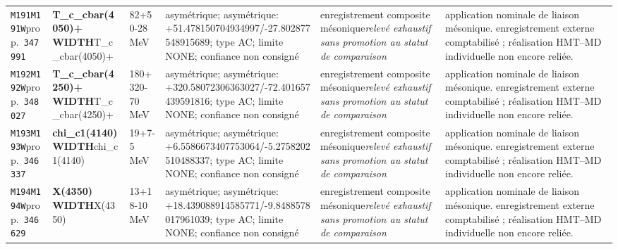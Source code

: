 \begin{landscape}
\begin{longtable}{L{1.85cm}L{4.45cm}L{2.35cm}L{4.05cm}L{3.35cm}L{7.15cm}}
\texttt{M191}\newline \texttt{M191W}\newline prop.\ \texttt{347991} & \textbf{T\_\allowbreak{}c\_\allowbreak{}cbar(4050)+ WIDTH}\newline T\_\allowbreak{}c\_\allowbreak{}cbar(4050)+ & 82+50-28\,MeV & asymétrique; asymétrique: +51.478150704934997/-27.802877548915689; type AC; limite NONE; confiance non consigné & enregistrement composite mésonique\newline \emph{relevé exhaustif sans promotion au statut de comparaison} & application nominale de liaison mésonique. enregistrement externe comptabilisé ; réalisation HMT--MD individuelle non encore reliée. \\
\texttt{M192}\newline \texttt{M192W}\newline prop.\ \texttt{348027} & \textbf{T\_\allowbreak{}c\_\allowbreak{}cbar(4250)+ WIDTH}\newline T\_\allowbreak{}c\_\allowbreak{}cbar(4250)+ & 180+320-70\,MeV & asymétrique; asymétrique: +320.58072306363027/-72.401657439591816; type AC; limite NONE; confiance non consigné & enregistrement composite mésonique\newline \emph{relevé exhaustif sans promotion au statut de comparaison} & application nominale de liaison mésonique. enregistrement externe comptabilisé ; réalisation HMT--MD individuelle non encore reliée. \\
\texttt{M193}\newline \texttt{M193W}\newline prop.\ \texttt{346337} & \textbf{chi\_\allowbreak{}c1(4140) WIDTH}\newline chi\_\allowbreak{}c1(4140) & 19+7-5\,MeV & asymétrique; asymétrique: +6.5586673407753064/-5.2758202510488337; type AC; limite NONE; confiance non consigné & enregistrement composite mésonique\newline \emph{relevé exhaustif sans promotion au statut de comparaison} & application nominale de liaison mésonique. enregistrement externe comptabilisé ; réalisation HMT--MD individuelle non encore reliée. \\
\texttt{M194}\newline \texttt{M194W}\newline prop.\ \texttt{346629} & \textbf{X(4350) WIDTH}\newline X(4350) & 13+18-10\,MeV & asymétrique; asymétrique: +18.439088914585771/-9.8488578017961039; type AC; limite NONE; confiance non consigné & enregistrement composite mésonique\newline \emph{relevé exhaustif sans promotion au statut de comparaison} & application nominale de liaison mésonique. enregistrement externe comptabilisé ; réalisation HMT--MD individuelle non encore reliée. \\

\end{longtable}
\end{landscape}
